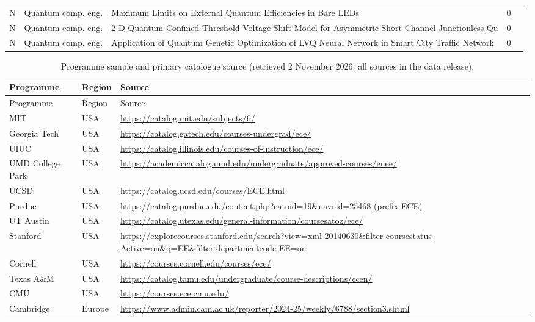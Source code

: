 \documentclass[10pt]{article}
\begin{document}
\begin{longtable}{@{}llL{8.6cm}lL{4.2cm}@{}}
N & Quantum comp. eng. & Maximum Limits on External Quantum Efficiencies in Bare LEDs & 0 &  \\
N & Quantum comp. eng. & 2-D Quantum Confined Threshold Voltage Shift Model for Asymmetric Short-Channel Junctionless Qu & 0 &  \\
N & Quantum comp. eng. & Application of Quantum Genetic Optimization of LVQ Neural Network in Smart City Traffic Network & 0 &  \\
\end{longtable}

\begin{longtable}{@{}llL{11.3cm}@{}}
\caption{Programme sample and primary catalogue source (retrieved 2 November 2026; all sources in the data release).}\label{tab:S4}\\
\toprule
Programme & Region & Source \\
\midrule
\endfirsthead
\toprule
Programme & Region & Source \\
\midrule
\endhead
\bottomrule
\endlastfoot
MIT & USA & {\scriptsize\url{https://catalog.mit.edu/subjects/6/}} \\
Georgia Tech & USA & {\scriptsize\url{https://catalog.gatech.edu/courses-undergrad/ece/}} \\
UIUC & USA & {\scriptsize\url{https://catalog.illinois.edu/courses-of-instruction/ece/}} \\
UMD College Park & USA & {\scriptsize\url{https://academiccatalog.umd.edu/undergraduate/approved-courses/enee/}} \\
UCSD & USA & {\scriptsize\url{https://catalog.ucsd.edu/courses/ECE.html}} \\
Purdue & USA & {\scriptsize\url{https://catalog.purdue.edu/content.php?catoid=19&navoid=25468 (prefix ECE)}} \\
UT Austin & USA & {\scriptsize\url{https://catalog.utexas.edu/general-information/coursesatoz/ece/}} \\
Stanford & USA & {\scriptsize\url{https://explorecourses.stanford.edu/search?view=xml-20140630&filter-coursestatus-Active=on&q=EE&filter-departmentcode-EE=on}} \\
Cornell & USA & {\scriptsize\url{https://courses.cornell.edu/courses/ece/}} \\
Texas A\&M & USA & {\scriptsize\url{https://catalog.tamu.edu/undergraduate/course-descriptions/ecen/}} \\
CMU & USA & {\scriptsize\url{https://courses.ece.cmu.edu/}} \\
Cambridge & Europe & {\scriptsize\url{https://www.admin.cam.ac.uk/reporter/2024-25/weekly/6788/section3.shtml}} \\

\end{longtable}
\end{document}
